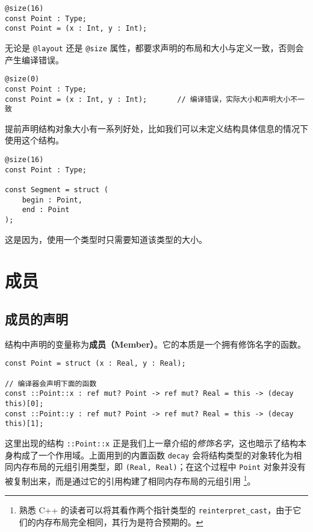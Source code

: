 \begin{lstlisting}
@size(16)
const Point : Type;
const Point = (x : Int, y : Int);
\end{lstlisting}

无论是 \lstinline!@layout! 还是 \lstinline!@size! 属性，都要求声明的布局和大小与定义一致，否则会产生编译错误。

\begin{lstlisting}
@size(0)
const Point : Type;
const Point = (x : Int, y : Int);		// 编译错误，实际大小和声明大小不一致
\end{lstlisting}

提前声明结构对象大小有一系列好处，比如我们可以未定义结构具体信息的情况下使用这个结构。

\begin{lstlisting}
@size(16)
const Point : Type;

const Segment = struct (
	begin : Point,
	end : Point
);
\end{lstlisting}

这是因为，使用一个类型时只需要知道该类型的大小。

\section{成员}

\subsection{成员的声明}

结构中声明的变量称为\textbf{成员（Member）}。它的本质是一个拥有修饰名字的函数。

\begin{lstlisting}
const Point = struct (x : Real, y : Real);

// 编译器会声明下面的函数
const ::Point::x : ref mut? Point -> ref mut? Real = this -> (decay this)[0];
const ::Point::y : ref mut? Point -> ref mut? Real = this -> (decay this)[1];
\end{lstlisting}

这里出现的结构 \lstinline!::Point::x! 正是我们上一章介绍的\emph{修饰名字}，这也暗示了结构本身构成了一个作用域。上面用到的内置函数 \lstinline!decay! 会将结构类型的对象转化为相同内存布局的元组引用类型，即 \lstinline!(Real, Real)!；在这个过程中 \lstinline!Point! 对象并没有被复制出来，而是通过它的引用构建了相同内存布局的元组引用 \footnote{熟悉 C++ 的读者可以将其看作两个指针类型的 \lstinline!reinterpret_cast!，由于它们的内存布局完全相同，其行为是符合预期的。}。 \\

